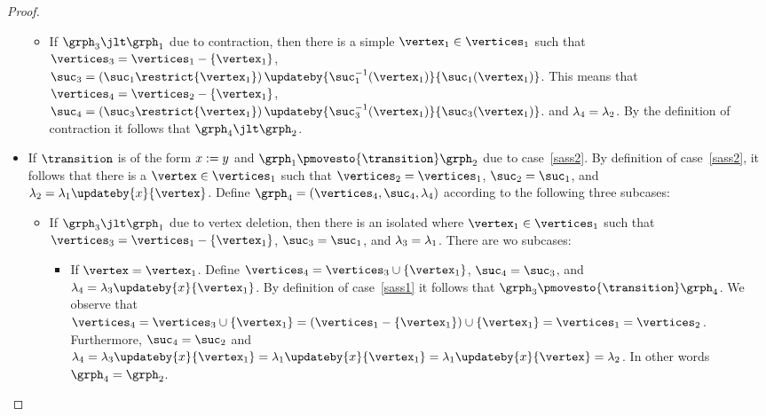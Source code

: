 \begin{proof}
\begin{itemize}
\begin{itemize}
\item
If $\grph_3\jlt\grph_1$ due to contraction, then
there is a simple  $\vertex_1\in\vertices_1$ such that
$\vertices_3=\vertices_1-\set{\vertex_1}$,
$\suc_3=\left(\suc_1\restrict{\vertex_1}\right)\updateby{\suc_1^{-1}(\vertex_1)}{\suc_1(\vertex_1)}$.
%
This means that 
$\vertices_4=\vertices_2-\set{\vertex_1}$,
$\suc_4=\left(\suc_3\restrict{\vertex_1}\right)\updateby{\suc_3^{-1}(\vertex_1)}{\suc_3(\vertex_1)}$.
and $\lambda_4=\lambda_2$.
%
By the definition of contraction it follows that
$\grph_4\jlt\grph_2$.
\end{itemize}
\item
If $\transition$ is of the form $x:=y$ and 
 $\grph_1\pmovesto{\transition}\grph_2$ due to case~\ref{sass2}.
%
By definition of case~\ref{sass2}, it follows 
that there is a $\vertex\in\vertices_1$ such that
$\vertices_2=\vertices_1$,
$\suc_2=\suc_1$, and $\labeling_2=\labeling_1\updateby{\xvar}{\vertex}$.
%
Define $\grph_4=\tuple{\vertices_4,\suc_4,\labeling_4}$ according to the following
three subcases:
%
\begin{itemize}
\item
If $\grph_3\jlt\grph_1$ due to vertex deletion, then
there is an isolated where $\vertex_1\in\vertices_1$ such that 
$\vertices_3=\vertices_1-\set{\vertex_1}$, 
$\suc_3=\suc_1$, and $\lambda_3=\lambda_1$.
There are wo subcases:
\begin{itemize}
\item
If $\vertex=\vertex_1$.
%
Define 
$\vertices_4=\vertices_3\cup\set{\vertex_1}$,
$\suc_4=\suc_3$, and $\labeling_4=\labeling_3\updateby{\xvar}{\vertex_1}$.
%
By definition of case~\ref{sass1} it follows that
$\grph_3\pmovesto{\transition}\grph_4$.
%
We observe that $\vertices_4=\vertices_3\cup\set{\vertex_1}=
(\vertices_1-\set{\vertex_1})\cup\set{\vertex_1}=
\vertices_1=\vertices_2$.
%
Furthermore,
$\suc_4=\suc_2$ and
$\labeling_4=\labeling_3\updateby{\xvar}{\vertex_1}=
\labeling_1\updateby{\xvar}{\vertex_1}=\labeling_1\updateby{\xvar}{\vertex}=
\labeling_2$.
%
In other words $\grph_4=\grph_2$.


\end{itemize}
\end{itemize}
\end{itemize}
\end{proof}

